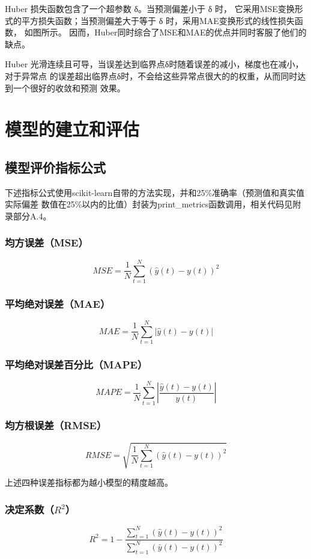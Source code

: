 \documentclass[AutoFakeBold]{LZUThesis}
\begin{document}
Huber 损失函数\cite{huber1992robust}包含了一个超参数 δ。当预测偏差小于 δ 时，
它采用MSE变换形式的平方损失函数；当预测偏差大于等于 δ 时，采用MAE变换形式的线性损失函数，
如图\label{fig_huber}所示。
因而，Huber同时综合了MSE和MAE的优点并同时客服了他们的缺点。

Huber 光滑连续且可导，当误差达到临界点δ时随着误差的减小，梯度也在减小，对于异常点
的误差超出临界点δ时，不会给这些异常点很大的的权重，从而同时达到一个很好的收敛和预测
效果。

\chapter{模型的建立和评估}
\section{模型评价指标公式}
下述指标公式使用scikit-learn自带的方法实现，并和25\%准确率（预测值和真实值实际偏差
数值在25\%以内的比值）封装为print\_metrics函数调用，相关代码见附录部分A.4。

\subsection{均方误差（MSE）}
$$MSE=\frac{1}{N}\sum_{t=1}^{N}\left(\hat{y}\left(t\right)-y\left(t\right)\right)^2$$

\subsection{平均绝对误差（MAE）}
$$MAE=\frac{1}{N}\sum_{t=1}^{N}\left|\hat{y}\left(t\right)-y\left(t\right)\right|$$

\subsection{平均绝对误差百分比（MAPE）}
$$MAPE=\frac{1}{N}\sum_{t=1}^{N}\left|\frac{\hat{y}\left(t\right)-y\left(t\right)}{y\left(t\right)}\right|$$

\subsection{均方根误差（RMSE）}
$$RMSE=\sqrt{\frac{1}{N}\sum_{t=1}^{N}\left(\hat{y}\left(t\right)-y\left(t\right)\right)^2}$$

上述四种误差指标都为越小模型的精度越高。

\subsection{决定系数（$R^2$）}
$$R^2=1-\frac{\sum_{t=1}^{N}(\hat{y}\left(t\right)-y\left(t\right))^2}{\sum_{t=1}^{N}(\bar{y}\left(t\right)-y\left(t\right))^2}$$
\end{document}
